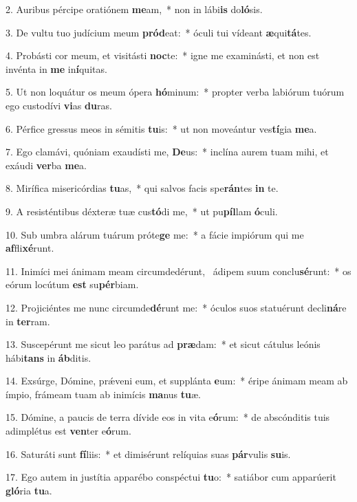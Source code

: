2. Auribus pércipe oratiónem \textbf{me}am,~*  non in lábi\textbf{is} do\textbf{ló}sis.\

3. De vultu tuo judícium meum \textbf{pród}eat:~*  óculi tui vídeant \textbf{æ}qui\textbf{tá}tes.\

4. Probásti cor meum, et visitásti \textbf{noc}te:~*  igne me examinásti, et non est invénta in \textbf{me} in\textbf{í}quitas.\

5. Ut non loquátur os meum ópera \textbf{hó}minum:~*  propter verba labiórum tuórum ego custodívi \textbf{vi}as \textbf{du}ras.\

6. Pérfice gressus meos in sémitis \textbf{tu}is:~*  ut non moveántur ves\textbf{tí}gia \textbf{me}a.\

7. Ego clamávi, quóniam exaudísti me, \textbf{De}us:~*  inclína aurem tuam mihi, et exáudi \textbf{ver}ba \textbf{me}a.\

8. Mirífica misericórdias \textbf{tu}as,~*  qui salvos facis spe\textbf{rán}tes \textbf{in} te.\

9. A resisténtibus déxteræ tuæ cus\textbf{tó}di me,~*  ut pu\textbf{píl}lam \textbf{ó}culi.\

10. Sub umbra alárum tuárum próte\textbf{ge} me:~*  a fácie impiórum qui me \textbf{af}fli\textbf{xé}runt.\

11. Inimíci mei ánimam meam circumdedérunt, \dag\  ádipem suum conclu\textbf{sé}runt:~*  os eórum locútum \textbf{est} su\textbf{pér}biam.\

12. Projiciéntes me nunc circumde\textbf{dé}runt me:~*  óculos suos statuérunt decli\textbf{ná}re in \textbf{ter}ram.\

13. Suscepérunt me sicut leo parátus ad \textbf{præ}dam:~*  et sicut cátulus leónis hábi\textbf{tans} in \textbf{áb}ditis.\

14. Exsúrge, Dómine, prǽveni eum, et supplánta \textbf{e}um:~*  éripe ánimam meam ab ímpio, frámeam tuam ab inimícis \textbf{ma}nus \textbf{tu}æ.\

15. Dómine, a paucis de terra dívide eos in vita e\textbf{ó}rum:~*  de abscónditis tuis adimplétus est \textbf{ven}ter e\textbf{ó}rum.\

16. Saturáti sunt \textbf{fí}liis:~*  et dimisérunt relíquias suas \textbf{pár}vulis \textbf{su}is.\

17. Ego autem in justítia apparébo conspéctui \textbf{tu}o:~*  satiábor cum apparúerit \textbf{gló}ria \textbf{tu}a.\

